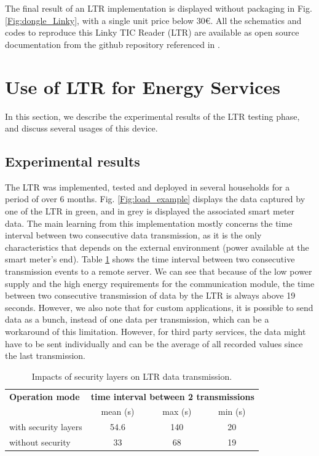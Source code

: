 \documentclass[conference]{IEEEtran}
\begin{document}
The final result of an LTR implementation is displayed without packaging in Fig. \ref{Fig:dongle_Linky}, with a single unit price below 30€. All the schematics and codes to reproduce this Linky TIC Reader (LTR) are  available as open source documentation from the github repository referenced in \cite{github:LTR}.





\section{Use of LTR for Energy Services}
\label{section:experiments}
In this section, we describe the experimental results of the LTR testing phase, and discuss several usages of this device. 
\subsection{Experimental results}
The LTR was implemented, tested and deployed in several households for a period of over 6 months. Fig. \ref{Fig:load_example} displays the data captured by one of the LTR in green, and in grey is displayed the associated smart meter data. The main learning from this implementation mostly concerns the time interval between two consecutive data transmission, as it is the only characteristics that depends on the external environment (power available at the smart meter's end). Table \ref{Table:securityimpact} shows the time interval between two consecutive transmission events to a remote server. We can see that because of the low power supply and the high energy requirements for the communication module, the time between  two consecutive transmission of data by the LTR is always above 19 seconds. However, we also note that for custom applications, it is possible to send data as a bunch, instead of one data per transmission, which can be a workaround of this limitation. However, for third party services, the data  might have to be sent individually and can be the average of all recorded values since the last transmission.



%
\begin{table}[h]
	\caption{Impacts of security layers on LTR data transmission.} %
\label{Table:securityimpact}
\small %
\centering %
\begin{tabular}{lccc} %
	\toprule[\heavyrulewidth]\toprule[\heavyrulewidth]
	\textbf{Operation mode} &  \multicolumn{3}{c}{ \textbf{time interval between 2 transmissions }} \\
	
	\textbf{} &  mean (s) &  max (s) &  min (s)\\		
	\midrule
	with security layers & 54.6 & 140 & 20 \\ 
	without security  & 33 & 68 & 19 \\ 
	\bottomrule[\heavyrulewidth] 
\end{tabular}
\end{table}
%
\end{document}

